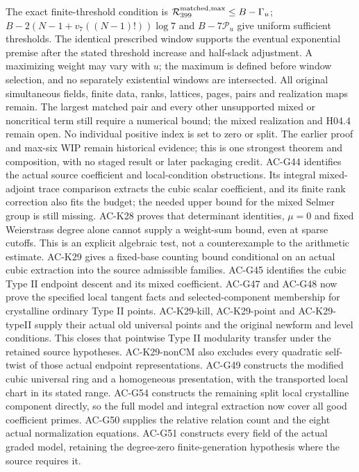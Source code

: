 \documentclass[11pt,a4paper]{article}
\theoremstyle{definition}
\theoremstyle{remark}
\begin{document}
The exact finite-threshold condition is
$\mathcal R_{399}^{\rm matched,max}\leq B-\Gamma_u$;
$B-2(N-1+v_7((N-1)!))\log7$ and $B-7\mathcal P_u$ give
uniform sufficient thresholds. The identical prescribed window
supports the eventual exponential premise after the stated threshold
increase and half-slack adjustment. A maximizing weight may vary
with $u$; the maximum is defined before window selection, and no
separately existential windows are intersected.
All original simultaneous fields, finite data, ranks, lattices,
pages, pairs and realization maps remain.
The largest matched pair and every other unsupported mixed or
noncritical term still require a numerical bound; the mixed
realization and H04.4 remain open. No individual positive index
is set to zero or split. The earlier proof and max-six WIP remain
historical evidence; this is one strongest theorem and composition,
with no staged result or later packaging credit.
AC-G44 identifies the actual source coefficient and local-condition
obstructions. Its integral mixed-adjoint trace comparison extracts
the cubic scalar coefficient, and its finite rank correction also
fits the budget; the needed upper bound for the mixed Selmer group
is still missing. AC-K28 proves that determinant identities,
$\mu=0$ and fixed Weierstrass degree alone cannot supply a
weight-sum bound, even at sparse cutoffs. This is an explicit
algebraic test, not a counterexample to the arithmetic estimate.
AC-K29 gives a fixed-base counting bound conditional on an actual
cubic extraction into the source admissible families. AC-G45 identifies
the cubic Type II endpoint descent and its mixed coefficient.
AC-G47 and AC-G48 now prove the specified local tangent facts and
selected-component membership for crystalline ordinary Type II points.
AC-K29-kill, AC-K29-point and AC-K29-typeII supply their actual old
universal points and the original newform and level conditions.
This closes that pointwise Type II modularity transfer under the
retained source hypotheses. AC-K29-nonCM also excludes every quadratic
self-twist of those actual endpoint representations. AC-G49 constructs
the modified cubic universal ring and a homogeneous presentation, with
the transported local chart in its stated range. AC-G54 constructs the
remaining split local crystalline component directly, so the full model
and integral extraction now cover all good coefficient primes. AC-G50 supplies the relative
relation count and the eight actual normalization equations. AC-G51
constructs every field of the actual graded model, retaining the
degree-zero finite-generation hypothesis where the source requires it.
\end{document}
